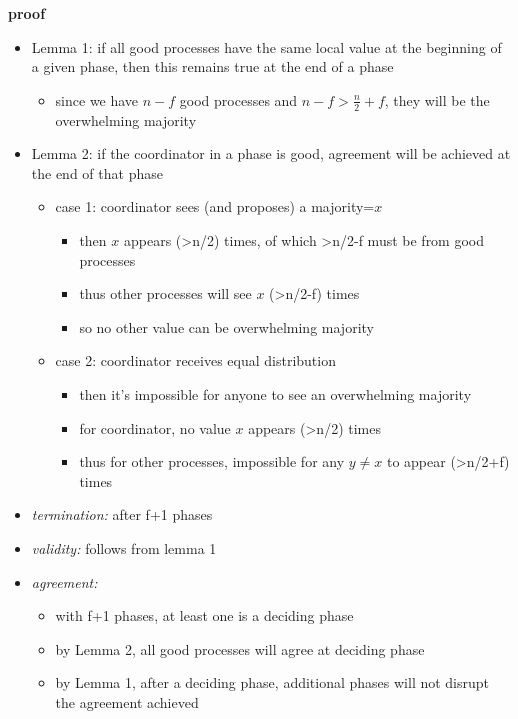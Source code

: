 \documentclass[10pt, landscape]{article}
\begin{document}
\begin{multicols*}{3}
  \textbf{proof}

  \begin{itemize}
    \item Lemma 1: if all good processes have the same local value at the beginning of a given phase, then this remains true at the end of a phase
      \begin{itemize}
        \item since we have $n-f$ good processes and $n-f > \frac{n}{2} + f$, they will be the overwhelming majority
      \end{itemize}
    \item Lemma 2: if the coordinator in a phase is good, agreement will be achieved at the end of that phase
      \begin{itemize}
        \item case 1: coordinator sees (and proposes) a majority=$x$
          \begin{itemize}
            \item then $x$ appears (>n/2) times, of which >n/2-f must be from good processes
            \item thus other processes will see $x$ (>n/2-f) times
            \item so no other value can be overwhelming majority
          \end{itemize}
        \item case 2: coordinator receives equal distribution
          \begin{itemize}
            \item then it’s impossible for anyone to see an overwhelming majority
            \item for coordinator, no value $x$ appears (>n/2) times
            \item thus for other processes, impossible for any $y \neq x$ to appear (>n/2+f) times
          \end{itemize}
      \end{itemize}
    \item \textit{termination:} after f+1 phases
    \item \textit{validity:} follows from lemma 1
    \item \textit{agreement:}
      \begin{itemize}
        \item with f+1 phases, at least one is a deciding phase
        \item by Lemma 2, all good processes will agree at deciding phase
        \item by Lemma 1, after a deciding phase, additional phases will not disrupt the agreement achieved
      \end{itemize}
  \end{itemize}


\end{multicols*}
\end{document}
